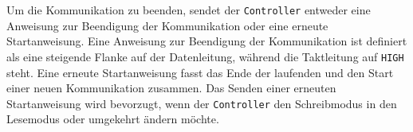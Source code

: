 Um die Kommunikation zu beenden, sendet der \texttt{Controller} entweder eine Anweisung zur Beendigung der Kommunikation oder eine erneute Startanweisung.
Eine Anweisung zur Beendigung der Kommunikation ist definiert als eine steigende Flanke auf der Datenleitung, während die Taktleitung auf \texttt{HIGH} steht.
Eine erneute Startanweisung fasst das Ende der laufenden und den Start einer neuen Kommunikation zusammen.
Das Senden einer erneuten Startanweisung wird bevorzugt, wenn der \texttt{Controller} den Schreibmodus in den Lesemodus oder umgekehrt ändern möchte.

\cite{I2C-spec_userManual}
